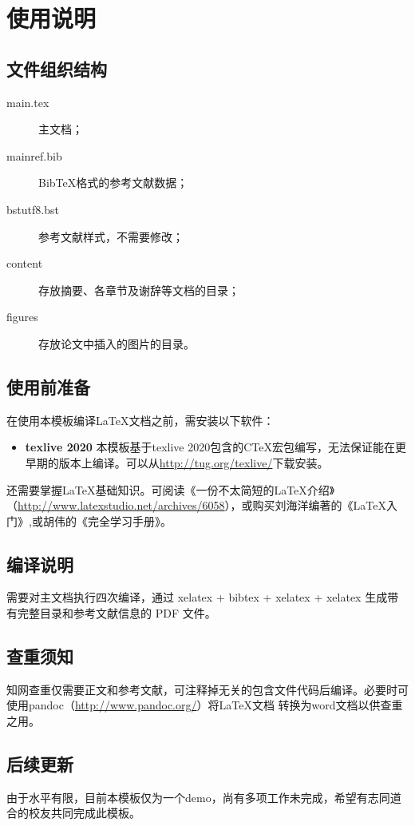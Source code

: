 \chapter{使用说明}


\section{文件组织结构}
\begin{description}
\item[main.tex] 主文档；
\item[mainref.bib] BibTeX格式的参考文献数据；
\item[bstutf8.bst] 参考文献样式，不需要修改；
\item[content] 存放摘要、各章节及谢辞等文档的目录；
\item[figures] 存放论文中插入的图片的目录。
\end{description}
\section{使用前准备}
在使用本模板编译\LaTeX 文档之前，需安装以下软件：
\begin{itemize}

\item{\bf texlive 2020} 本模板基于texlive 2020包含的CTeX宏包编写，无法保证能在更早期的版本上编译。可以从\url{http://tug.org/texlive/}下载安装。
\end{itemize}

还需要掌握\LaTeX 基础知识。可阅读《一份不太简短的\LaTeX 介绍》（\url{http://www.latexstudio.net/archives/6058}），或购买刘海洋编著的《\LaTeX 入门》,或胡伟的《\LaTeXe 完全学习手册》。

\section{编译说明}
需要对主文档执行四次编译，通过 xelatex + bibtex + xelatex + xelatex 生成带有完整目录和参考文献信息的 PDF 文件。

\section{查重须知}
知网查重仅需要正文和参考文献，可注释掉无关的包含文件代码后编译。必要时可使用pandoc（\url{http://www.pandoc.org/}）将\LaTeX 文档 转换为word文档以供查重之用。

\section{后续更新}
由于水平有限，目前本模板仅为一个demo，尚有多项工作未完成，希望有志同道合的校友共同完成此模板。

